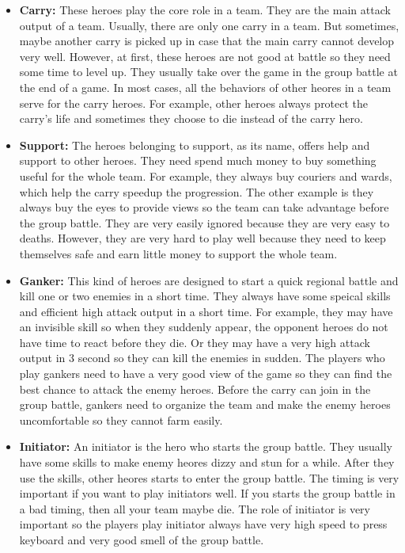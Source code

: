 \documentclass{article}
\begin{document}
\begin{itemize}
\item \textbf{Carry:}
These heroes play the core role in a team.
They are the main attack output of a team.
Usually, there are only one carry in a team.
But sometimes, maybe another carry is picked up in case that the main carry cannot develop very well.
However, at first, these heroes are not good at battle so they need some time to level up.
They usually take over the game in the group battle at the end of a game.
In most cases, all the behaviors of other heores in a team serve for the carry heroes.
For example, other heroes always protect the carry's life and sometimes they choose to die instead of the carry hero.
\item \textbf{Support:} 
The heroes belonging to support, as its name, offers help and support to other heroes.
They need spend much money to buy something useful for the whole team.
For example, they always buy couriers and wards, which help the carry speedup the progression.
The other example is they always buy the eyes to provide views so the team can take advantage before the group battle.
They are very easily ignored because they are very easy to deaths. 
However, they are very hard to play well because they need to keep themselves 
safe and earn little money to support the whole team.
\item \textbf{Ganker:}
This kind of heroes are designed to start a quick regional battle and kill one or two enemies in a short time.
They always have some speical skills and efficient high attack output in a short time.
For example, they may have an invisible skill so when they suddenly appear,
the opponent heroes do not have time to react before they die.
Or they may have a very high attack output in 3 second so they can kill the enemies in sudden.
The players who play gankers need to have a very good view of the game so
they can find the best chance to attack the enemy heroes.
Before the carry can join in the group battle,
gankers need to organize the team and make the enemy heroes
uncomfortable so they cannot farm easily.
\item \textbf{Initiator:}
An initiator is the hero who starts the group battle.
They usually have some skills to make enemy heores dizzy and stun for a while.
After they use the skills, other heores starts to enter the group battle.
The timing is very important if you want to play initiators well.
If you starts the group battle in a bad timing, then all your team maybe die.
The role of initiator is very important so the players play initiator always
have very high speed to press keyboard and very good smell of the group battle.
\end{itemize}
\end{document}
